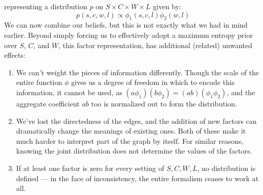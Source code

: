 \documentclass{article}
\begin{document}
\begin{example}
\begin{center}
		\end{center}
		representing a distribution $p$ on $S \times C \times W \times L$ given by:
		\[ p(s, c, w, l) \propto \phi_1(s,c,l) \phi_2(w,l) \]
		We can now combine our beliefs, but this is not exactly what we had in mind earlier. Beyond simply forcing us to effectively adopt a maximum entropy prior over $S$, $C$, and $W$, this factor representation, has additional (related) unwanted effects:
		\begin{enumerate}
			\item We can't weight the pieces of information differently. Though the scale of the entire function $\phi$ gives us a degree of freedom in which to encode this information, it cannot be used, as $(a\phi_1) (b\phi_2) = (ab) (\phi_1\phi_2)$, and the aggregate coefficient $ab$ too is normalized out to form the distribution.
			\item We've lost the directedness of the edges, and the addition of new factors can dramatically change the meanings of existing ones. Both of these make it much harder to interpret part of the graph by itself. For similar reasons, knowing the joint distribution does not determine the values of the factors.
			\item If at least one factor is zero for every setting of $S,C,W,L$, no distribution is defined --- in the face of inconsistency, the entire formalism ceases to work at all.
		\end{enumerate} 
		
		
		
	\end{example}
\end{document}
